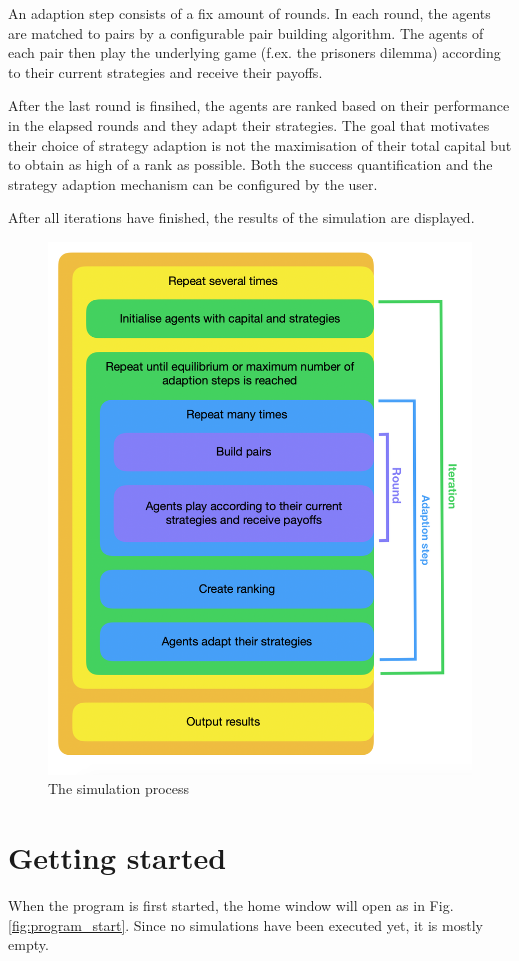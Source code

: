 \documentclass[parskip=full,11pt]{scrartcl}
\begin{document}
An adaption step consists of a fix amount of rounds. In each round, the agents are matched to pairs by a configurable pair building algorithm. The agents of each pair then play the underlying game (f.ex. the prisoners dilemma) according to their current strategies and receive their payoffs.

After the last round is finsihed, the agents are ranked based on their performance in the elapsed rounds and they adapt their strategies. The goal that motivates their choice of strategy adaption is not the maximisation of their total capital but to obtain as high of a rank as possible. Both the success quantification and the strategy adaption mechanism can be configured by the user.

After all iterations have finished, the results of the simulation are displayed.

\begin{figure}
	\centering
	\includegraphics[width=0.9\linewidth]{img_manual/SchemaEnglisch.png}
	\caption{The simulation process}
	\label{fig:simulation_process}
\end{figure}

\pagebreak
\section{Getting started}
When the program is first started, the home window will open as in Fig. \ref{fig:program_start}. Since no simulations have been executed yet, it is mostly empty.
\end{document}
